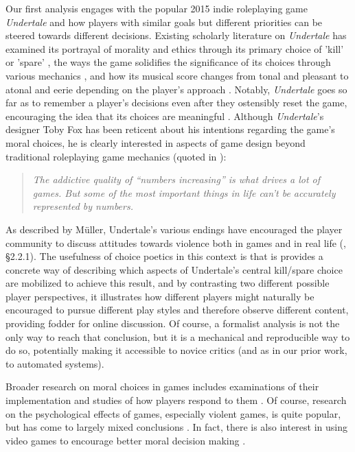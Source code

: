 \documentclass[arts,article,submit,moreauthors,pdftex,10pt,a4paper]{Definitions/mdpi}
\begin{document}
Our first analysis engages with the popular 2015 indie roleplaying game \emph{Undertale} and how players with similar goals but different priorities can be steered towards different decisions.
%
Existing scholarly literature on \emph{Undertale} has examined its portrayal of morality and ethics through its primary choice of 'kill' or 'spare' \citep{muller2017undertale}, the ways the game solidifies the significance of its choices through various mechanics \citep{day2017agency}, and how its musical score changes from tonal and pleasant to atonal and eerie depending on the player's approach \citep{perez2017undertale}.
%
Notably, \emph{Undertale} goes so far as to remember a player's decisions even after they ostensibly reset the game, encouraging the idea that its choices are meaningful \citep{hughes2015undertale}.
%
Although \emph{Undertale}'s designer Toby Fox has been reticent about his intentions regarding the game's moral choices, he is clearly interested in aspects of game design beyond traditional roleplaying game mechanics (quoted in \cite{feeld2015interview}):

\begin{quote}
  \itshape
The addictive quality of ``numbers increasing'' is what drives a lot of games. But some of the most important things in life can't be accurately represented by numbers.
\end{quote}


As described by Müller, Undertale's various endings have encouraged the player community to discuss attitudes towards violence both in games and in real life (\cite{muller2017undertale}, §2.2.1).
%
The usefulness of choice poetics in this context is that is provides a concrete way of describing which aspects of Undertale's central kill/spare choice are mobilized to achieve this result, and by contrasting two different possible player perspectives, it illustrates how different players might naturally be encouraged to pursue different play styles and therefore observe different content, providing fodder for online discussion.
%
Of course, a formalist analysis is not the only way to reach that conclusion, but it is a mechanical and reproducible way to do so, potentially making it accessible to novice critics (and as in our prior work, to automated systems).


Broader research on moral choices in games includes examinations of their implementation and studies of how players respond to them \citep{svelch2010good,weaver2012mirrored,consalvo2016playing}.
%
Of course, research on the psychological effects of games, especially violent games, is quite popular, but has come to largely mixed conclusions \citep{ferguson2008school,ellithorpe2015moral}.
%
In fact, there is also interest in using video games to encourage better moral decision making \citep{kastarov2017training}.
\end{document}
